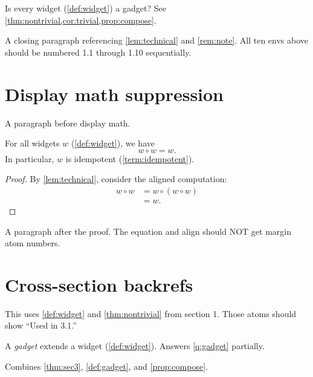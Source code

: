 \documentclass{article}
\begin{document}
\begin{question}\label{q:gadget}
Is every widget (\cref{def:widget}) a gadget?
See \cref{thm:nontrivial,cor:trivial,prop:compose}.
\end{question}

A closing paragraph referencing \cref{lem:technical} and \cref{rem:note}.
All ten envs above should be numbered 1.1 through 1.10 sequentially.

\section{Display math suppression}

A paragraph before display math.

\begin{theorem}\label{thm:idempotent}
For all widgets $w$ (\cref{def:widget}), we have
\begin{equation}\label{eq:widget}
  w \circ w = w.
\end{equation}
In particular, $w$ is idempotent (\cref{term:idempotent}).
\end{theorem}

\begin{proof}
By \cref{lem:technical}, consider the aligned computation:
\begin{align}
  w \circ w &= w \circ (w \circ w) \\
            &= w.
\end{align}
\end{proof}

A paragraph after the proof. The equation and align should NOT get
margin atom numbers.

\section{Cross-section backrefs}

\begin{theorem}\label{thm:sec3}
This uses \cref{def:widget} and \cref{thm:nontrivial} from section 1.
Those atoms should show ``Used in 3.1.''
\end{theorem}

\begin{definition}\label{def:gadget}
A \emph{gadget} extends a widget (\cref{def:widget}).
Answers \cref{q:gadget} partially.
\end{definition}

\begin{corollary}\label{cor:sec3}
Combines \cref{thm:sec3}, \cref{def:gadget}, and \cref{prop:compose}.
\end{corollary}
\end{document}
